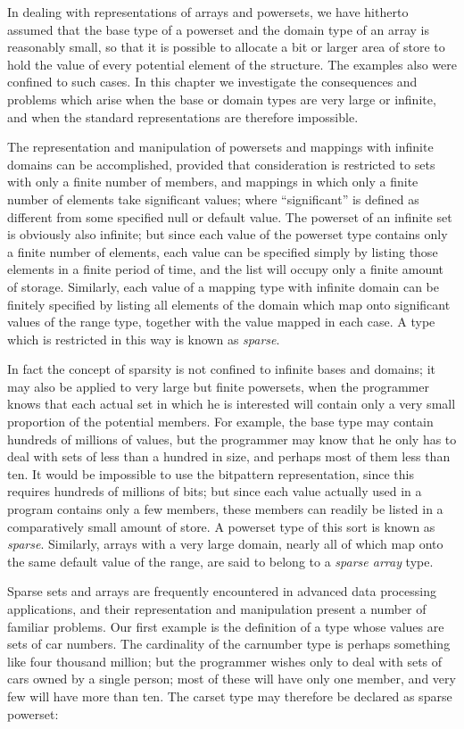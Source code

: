 In dealing with representations of arrays and powersets, we have hitherto assumed that the base type of a powerset and the domain type of an array is reasonably small, so that it is possible to allocate a bit or larger area of store to hold the value of every potential element of the structure. The examples also were confined to such cases. In this chapter we investigate the consequences and problems which arise when the base or domain types are very large or infinite, and when the standard representations are therefore impossible.

The representation and manipulation of powersets and mappings with infinite domains can be accomplished, provided that consideration is restricted to sets with only a finite number of members, and mappings in which only a finite number of elements take significant values; where ``significant'' is defined as different from some specified null or default value. The powerset of an infinite set is obviously also infinite; but since each value of the powerset type contains only a finite number of elements, each value can be specified simply by listing those elements in a finite period of time, and the list will occupy only a finite amount of storage. Similarly, each value of a mapping type with infinite domain can be finitely specified by listing all elements of the domain which map onto significant values of the range type, together with the value mapped in each case. A type which is restricted in this way is known as \textit{sparse}.

In fact the concept of sparsity is not confined to infinite bases and domains; it may also be applied to very large but finite powersets, when the programmer knows that each actual set in which he is interested will contain only a very small proportion of the potential members. For example, the base type may contain hundreds of millions of values, but the programmer may know that he only has to deal with sets of less than a hundred in size, and perhaps most of them less than ten. It would be impossible to use the bitpattern representation, since this requires hundreds of millions of bits; but since each value actually used in a program contains only a few members, these members can readily be listed in a comparatively small amount of store. A powerset type of this sort is known as \textit{sparse}. Similarly, arrays with a very large domain, nearly all of which map onto the same default value of the range, are said to belong to a \textit{sparse array} type.

Sparse sets and arrays are frequently encountered in advanced data processing applications, and their representation and manipulation present a number of familiar problems. Our first example is the definition of a type whose values are sets of car numbers. The cardinality of the carnumber type is perhaps something like four thousand million; but the programmer wishes only to deal with sets of cars owned by a single person; most of these will have only one member, and very few will have more than ten. The carset type may therefore be declared as sparse powerset:

